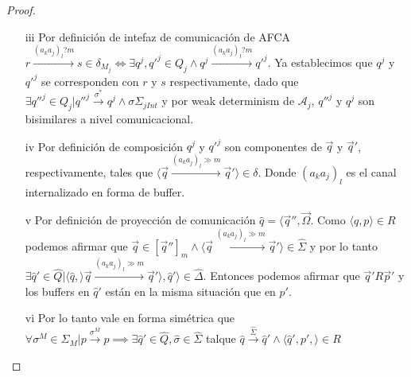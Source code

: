 \begin{prop}
\begin{proof}
\begin{itemize}
    \item[iii] Por definición de intefaz de comunicación de AFCA $r \xrightarrow{(a_ka_j)_l?m} s \in \delta_{M_j} \iff \exists q^j,q'^j \in Q_j \land q^j \xrightarrow{(a_ka_j)_l?m} q'^j$. Ya establecimos que $q^j$ y $q'^j$ se corresponden con $r$ y $s$ respectivamente, dado que $\exists q''^j \in Q_j | q''^j \xrightarrow{\sigma^*} q^j \land \sigma \Sigma_{jInt}$ y por weak determinism de $\mathcal{A}_j$, $q''^j$ y $q^j$ son bisimilares a nivel comunicacional.
    
    \item[iv] Por definición de composición $q^j$ y $q'^j$ son componentes de $\overrightarrow{q}$ y $\overrightarrow{q}'$, respectivamente, tales que $\langle \overrightarrow{q} \xrightarrow{(a_ka_j)_l \gg m} \overrightarrow{q}' \rangle \in \delta$. Donde $(a_ka_j)_l$ es el canal internalizado en forma de buffer.
    
    \item[v] Por definición de proyección de comunicación $\hat{q} = \langle \overrightarrow{q}'', \overrightarrow{\Omega}$. Como $\langle \hat{q}, p \rangle \in R$ podemos afirmar que $\overrightarrow{q} \in [\overrightarrow{q}'']_m \land \langle \overrightarrow{q} \xrightarrow{(a_ka_j)_l \gg m} \overrightarrow{q}' \rangle \in \hat{\Sigma}$ y por lo tanto $\exists \hat{q}' \in \hat{Q} | \langle \hat{q}, \rangle \overrightarrow{q} \xrightarrow{(a_ka_j)_l \gg m} \overrightarrow{q}' \rangle, \hat{q}' \rangle  \in \hat{\Delta}$. Entonces podemos afirmar que $\overrightarrow{q}'R\overrightarrow{p}'$ y los buffers en $\hat{q}'$ están en la misma situación que en $p'$.  
    
    \item[vi] Por lo tanto vale en forma simétrica que $\forall \sigma^M \in \Sigma_M | p \xrightarrow{\sigma^M} p \implies \exists \hat{q}' \in \hat{Q}, \hat{\sigma} \in \hat{\Sigma}$ talque $\hat{q} \xrightarrow{\hat{\Sigma}} \hat{q}' \land \langle \hat{q}', p', \rangle \in R$
    
\end{itemize}


\end{proof}
\end{prop}

\newpage


